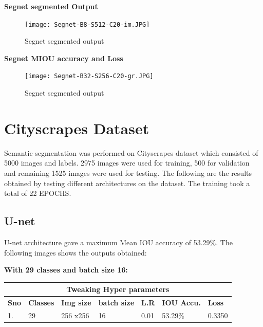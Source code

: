 \documentclass{IEEEtran}
\begin{document}
\begin{enumerate}
\textbf{Segnet segmented Output}

\begin{figure}[h]
    \centering
    \captionsetup{justification=centering}
    \texttt{[image: Segnet-B8-S512-C20-im.JPG]}
    \caption{Segnet segmented output}
    \label{fig:Binary class segmented output}
\end{figure}


\textbf{Segnet MIOU accuracy and Loss}

\begin{figure}[h]
    \centering
    \captionsetup{justification=centering}
    \texttt{[image: Segnet-B32-S256-C20-gr.JPG]}
    \caption{Segnet segmented output}
    \label{fig:Binary class segmented output}
\end{figure}


\end{enumerate}

\section{\textbf{Cityscrapes Dataset}}
Semantic segmentation was performed on Cityscrapes dataset which consisted of 5000 images and labels. 2975 images were used for training, 500 for validation and remaining 1525 images were used for testing. The following are the results obtained by testing different architectures on the dataset. The training took a total of 22 EPOCHS.

\subsection{\textbf{U-net}} U-net architecture gave a maximum Mean IOU accuracy of 53.29\%. The following images shows the outputs obtained:

\textbf{With 29 classes and batch size 16:}
\newline

\begin{tabular}{ |p{0.6cm}|p{1.2cm}|p{0.6cm}|p{0.6cm}|p{0.6cm}|p{0.8cm}|p{0.8cm}|}
 \hline
 \multicolumn{7}{|c|}{\textbf{Tweaking Hyper parameters}} \\
 \hline
 \textbf{Sno} & \textbf{Classes} & \textbf{Img size} & \textbf{batch size} & \textbf{L.R} & \textbf{IOU Accu.} & \textbf{Loss} \\
 \hline
 1. & 29   & 256 x256   & 16  & 0.01 & 53.29\% & 0.3350 \\
 \hline
\end{tabular}
\end{document}
